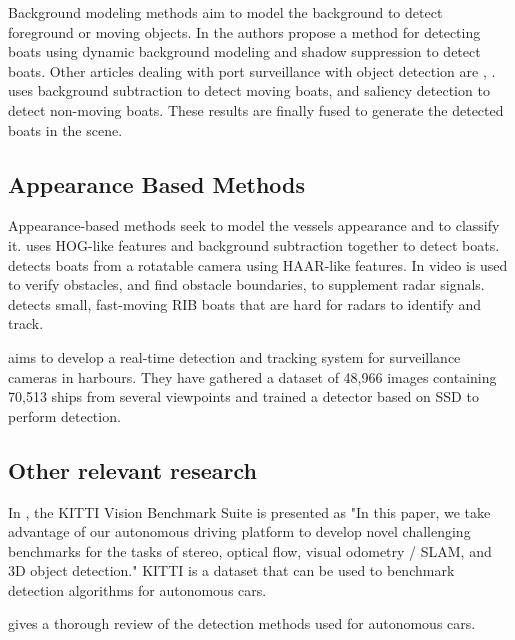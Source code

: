 Background modeling methods aim to model the background to detect foreground or moving objects. In \citep{BackgroundWaveletSubstract} the authors propose a method for detecting boats using dynamic background modeling and shadow suppression to detect boats. Other articles dealing with port surveillance with object detection are \citep{SeeCoast}, \citep{Pires2010}. \citep{Tran2016} uses background subtraction to detect moving boats, and saliency detection to detect non-moving boats. These results are finally fused to generate the detected boats in the scene. 

\subsection{Appearance Based Methods}
Appearance-based methods seek to model the vessels appearance and to classify it. \citep{HOGdetection} uses HOG-like features and background subtraction together to detect boats. \citep{HAARdetection} detects boats from a rotatable camera using HAAR-like features. In \citep{Wedel2007} video is used to verify obstacles, and find obstacle boundaries, to supplement radar signals. \citep{RIBDetection} detects small, fast-moving RIB boats that are hard for radars to identify and track.  

\vspace{3mm}

\citep{SSD_detection2018} aims to develop a real-time detection and tracking system for surveillance cameras in harbours. They have gathered a dataset of 48,966 images containing 70,513 ships from several viewpoints and trained a detector based on SSD \citep{SSD} to perform detection. 


\subsection{Other relevant research}

In \citep{KITTI}, the KITTI Vision Benchmark Suite is presented as "In this paper, we take advantage
of our autonomous driving platform to develop novel challenging
benchmarks for the tasks of stereo, optical flow, visual
odometry / SLAM, and 3D object detection."  KITTI is a dataset that can be used to benchmark detection algorithms for autonomous cars.

\citep{Sun2006} gives a thorough review of the detection methods used for autonomous cars. 

\vspace{3mm}

